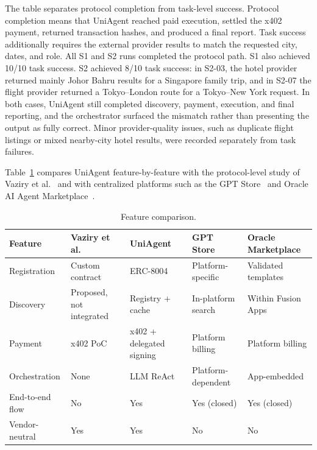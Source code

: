 \documentclass[sigconf]{acmart}
\begin{document}
The table separates protocol completion from task-level
success. Protocol completion means that UniAgent reached paid execution,
settled the x402 payment, returned transaction hashes, and produced a
final report. Task success additionally requires the external provider
results to match the requested city, dates, and role. All S1 and S2 runs
completed the protocol path. S1 also achieved 10/10 task success. S2
achieved 8/10 task success: in S2-03, the hotel provider returned mainly
Johor Bahru results for a Singapore family trip, and in S2-07 the flight
provider returned a Tokyo--London route for a Tokyo--New York request.
In both cases, UniAgent still completed discovery, payment, execution,
and final reporting, and the orchestrator surfaced the mismatch rather
than presenting the output as fully correct. Minor provider-quality
issues, such as duplicate flight listings or mixed nearby-city hotel
results, were recorded separately from task failures.

Table~\ref{tab:comparison} compares UniAgent feature-by-feature with the
protocol-level study of Vaziry et al.~\cite{vaziry2025} and with
centralized platforms such as the GPT Store~\cite{gptstore} and Oracle
AI Agent Marketplace~\cite{oracleAgentMarketplace2025}.

\begin{table}[t]
  \centering
  \caption{Feature comparison.}
  \label{tab:comparison}
  \small
  \begin{tabular}{@{}p{}p{}p{}p{}p{}@{}}
    \toprule
    Feature & Vaziry et al. & UniAgent & GPT Store & Oracle Marketplace \\
    \midrule
    Registration & Custom contract & ERC-8004 & Platform-specific & Validated templates \\
    Discovery & Proposed, not integrated & Registry + cache & In-platform search & Within Fusion Apps \\
    Payment & x402 PoC & x402 + delegated signing & Platform billing & Platform billing \\
    Orchestration & None & LLM ReAct & Platform-dependent & App-embedded \\
    End-to-end flow & No & Yes & Yes (closed) & Yes (closed) \\
    Vendor-neutral & Yes & Yes & No & No \\
    \bottomrule
  \end{tabular}
\end{table}
\end{document}
